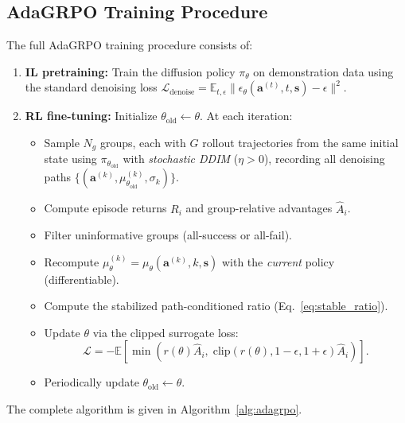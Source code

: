 \documentclass{article}
\newcommand{\E}{\mathbb{E}}
\newcommand{\ba}{\mathbf{a}}
\newcommand{\bs}{\mathbf{s}}
\begin{document}
\subsection{AdaGRPO Training Procedure}
\label{sec:training}

The full AdaGRPO training procedure consists of:

\begin{enumerate}
\item \textbf{IL pretraining:} Train the diffusion policy $\pi_\theta$ on demonstration data using the standard denoising loss $\mathcal{L}_\text{denoise} = \E_{t, \epsilon}\|\epsilon_\theta(\ba^{(t)}, t, \bs) - \epsilon\|^2$.

\item \textbf{RL fine-tuning:} Initialize $\theta_\text{old} \leftarrow \theta$.
At each iteration:
\begin{itemize}
\item Sample $N_g$ groups, each with $G$ rollout trajectories from the same initial state using $\pi_{\theta_\text{old}}$ with \emph{stochastic DDIM} ($\eta > 0$), recording all denoising paths $\{(\ba^{(k)}, \mu_{\theta_\text{old}}^{(k)}, \sigma_k)\}$.
\item Compute episode returns $R_i$ and group-relative advantages $\hat{A}_i$.
\item Filter uninformative groups (all-success or all-fail).
\item Recompute $\mu_\theta^{(k)} = \mu_\theta(\ba^{(k)}, k, \bs)$ with the \emph{current} policy (differentiable).
\item Compute the stabilized path-conditioned ratio (Eq.~\ref{eq:stable_ratio}).
\item Update $\theta$ via the clipped surrogate loss:
\begin{equation}
\mathcal{L} = -\E\left[\min\left(r(\theta)\hat{A}_i,\; \text{clip}(r(\theta), 1{-}\epsilon, 1{+}\epsilon)\hat{A}_i\right)\right].
\end{equation}
\item Periodically update $\theta_\text{old} \leftarrow \theta$.
\end{itemize}
\end{enumerate}

The complete algorithm is given in Algorithm~\ref{alg:adagrpo}.
\end{document}
